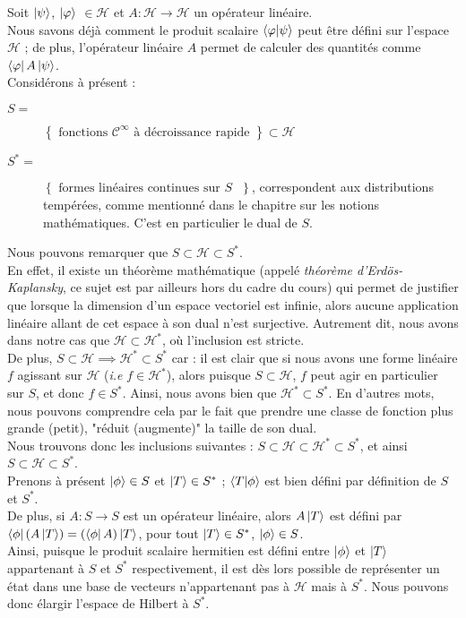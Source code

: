 \documentclass{article}
\begin{document}
Soit $\ket{\psi}$, $\ket{\varphi}$ $\in \mathcal{H}$ et $A : \mathcal{H} \rightarrow \mathcal{H}$ un opérateur linéaire. \\
Nous savons déjà comment le produit scalaire $\braket{\varphi | \psi}$ peut être défini sur l'espace $\mathcal{H}$ ; de plus, l'opérateur linéaire $A$ permet de calculer des quantités comme $\bra{\varphi} A \ket{\psi}$. \\

Considérons à présent : \begin{description}
    \item[$S =$] $\left\{ \mbox{ fonctions $\mathcal{C}^{\infty}$ à décroissance rapide } \right\} \subset \mathcal{H}$  
    \item[$S^*=$] $\left\{ \mbox{ formes linéaires continues sur $S$ } \right\}$, correspondent aux distributions tempérées, comme mentionné dans le chapitre sur les notions mathématiques. C'est en particulier le dual de $S$. 
\end{description}

Nous pouvons remarquer que $S \subset \mathcal{H} \subset{S^*}$. \\
En effet, il existe un théorème mathématique (appelé \textit{théorème d'Erdös-Kaplansky}, ce sujet est par ailleurs hors du cadre du cours) qui permet de justifier que lorsque la dimension d'un espace vectoriel est infinie, alors aucune application linéaire allant de cet espace à son dual n'est surjective. Autrement dit, nous avons dans notre cas que $\mathcal{H} \subset \mathcal{H}^*$, où l'inclusion est stricte. \\
De plus, $S \subset \mathcal{H} \implies \mathcal{H}^* \subset S^*$ car : il est clair que si nous avons une forme linéaire $f$ agissant sur $\mathcal{H}$ (\textit{i.e} $f \in \mathcal{H}^*$), alors puisque $S \subset \mathcal{H}$, $f$ peut agir en particulier sur $S$, et donc $f \in S^*$. Ainsi, nous avons bien que $\mathcal{H}^* \subset S^*$. En d'autres mots, nous pouvons comprendre cela par le fait que prendre une classe de fonction plus grande (petit), "réduit (augmente)" la taille de son dual. \\

Nous trouvons donc les inclusions suivantes : $S \subset \mathcal{H} \subset \mathcal{H}^* \subset S^*$, et ainsi $S \subset \mathcal{H} \subset S^*$. \\

Prenons à présent $\ket{\phi} \in S$ et $\ket{T} \in S^*$ ; $\braket{T|\phi}$ est bien défini par définition de $S$ et $S^*$. \\
De plus, si $A : S \rightarrow S$ est un opérateur linéaire, alors $A \ket{T}$ est défini par $\bra{\phi}(A\ket{T}) = (\bra{\phi}A)\ket{T}$, pour tout $\ket{T} \in S^*$, $\ket{\phi} \in S$. \\
Ainsi, puisque le produit scalaire hermitien est défini entre $\ket{\phi}$ et $\ket{T}$ appartenant à $S$ et $S^*$ respectivement, il est dès lors possible de représenter un état dans une base de vecteurs n'appartenant pas à $\mathcal{H}$ mais à $S^*$. Nous pouvons donc élargir l'espace de Hilbert à $S^*$. \\
\end{document}
